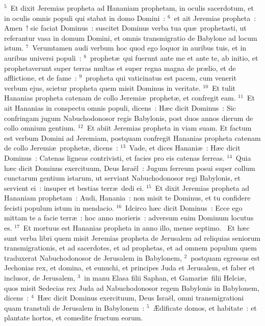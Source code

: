 ${}^{5}$~Et dixit Jeremias propheta ad Hananiam prophetam, in oculis sacerdotum, et in oculis omnis populi qui stabat in domo Domini~:
${}^{6}$~et ait Jeremias propheta~: Amen~! sic faciat Dominus~: suscitet Dominus verba tua qu\ae\ prophetasti, ut referantur vasa in domum Domini, et omnis transmigratio de Babylone ad locum istum.
${}^{7}$~Verumtamen audi verbum hoc quod ego loquor in auribus tuis, et in auribus universi populi~:
${}^{8}$~prophet\ae\ qui fuerunt ante me et ante te, ab initio, et prophetaverunt super terras multas et super regna magna de pr\ae lio, et de afflictione, et de fame~:
${}^{9}$~propheta qui vaticinatus est pacem, cum venerit verbum ejus, scietur propheta quem misit Dominus in veritate.
${}^{10}$~Et tulit Hananias propheta catenam de collo Jeremi\ae\ prophet\ae , et confregit eam.
${}^{11}$~Et ait Hananias in conspectu omnis populi, dicens~: H\ae c dicit Dominus~: Sic confringam jugum Nabuchodonosor regis Babylonis, post duos annos dierum de collo omnium gentium.
${}^{12}$~Et abiit Jeremias propheta in viam suam. Et factum est verbum Domini ad Jeremiam, postquam confregit Hananias propheta catenam de collo Jeremi\ae\ prophet\ae , dicens~:
${}^{13}$~Vade, et dices Hanani\ae~: H\ae c dicit Dominus~: Catenas ligneas contrivisti, et facies pro eis catenas ferreas.
${}^{14}$~Quia h\ae c dicit Dominus exercituum, Deus Isra\"el~: Jugum ferreum posui super collum cunctarum gentium istarum, ut serviant Nabuchodonosor regi Babylonis, et servient ei~: insuper et bestias terr\ae\ dedi ei.
${}^{15}$~Et dixit Jeremias propheta ad Hananiam prophetam~: Audi, Hanania~: non misit te Dominus, et tu confidere fecisti populum istum in mendacio.
${}^{16}$~Idcirco h\ae c dicit Dominus~: Ecce ego mittam te a facie terr\ae~: hoc anno morieris~: adversum enim Dominum locutus es.
${}^{17}$~Et mortuus est Hananias propheta in anno illo, mense septimo.
~Et h\ae c sunt verba libri quem misit Jeremias propheta de Jerusalem ad reliquias seniorum transmigrationis, et ad sacerdotes, et ad prophetas, et ad omnem populum quem traduxerat Nabuchodonosor de Jerusalem in Babylonem,
${}^{2}$~postquam egressus est Jechonias rex, et domina, et eunuchi, et principes Juda et Jerusalem, et faber et inclusor, de Jerusalem,
${}^{3}$~in manu Elasa filii Saphan, et Gamari\ae\ filii Helci\ae , quos misit Sedecias rex Juda ad Nabuchodonosor regem Babylonis in Babylonem, dicens~:
${}^{4}$~H\ae c dicit Dominus exercituum, Deus Isra\"el, omni transmigrationi quam transtuli de Jerusalem in Babylonem~:
${}^{5}$~\AE dificate domos, et habitate~: et plantate hortos, et comedite fructum eorum.
